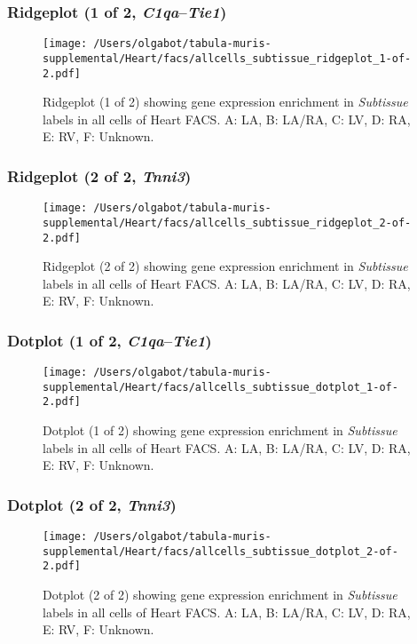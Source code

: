 \clearpage

\subsubsection{Ridgeplot (1 of 2, \emph{C1qa}--\emph{Tie1})}
\begin{figure}[h]
\centering
\texttt{[image: /Users/olgabot/tabula-muris-supplemental/Heart/facs/allcells\_subtissue\_ridgeplot\_1-of-2.pdf]}

\caption{ Ridgeplot (1 of 2)  showing gene expression enrichment in \emph{Subtissue} labels in all cells of Heart FACS. A: LA, B: LA/RA, C: LV, D: RA, E: RV, F: Unknown.}
\end{figure}


\clearpage

\subsubsection{Ridgeplot (2 of 2, \emph{Tnni3})}
\begin{figure}[h]
\centering
\texttt{[image: /Users/olgabot/tabula-muris-supplemental/Heart/facs/allcells\_subtissue\_ridgeplot\_2-of-2.pdf]}

\caption{ Ridgeplot (2 of 2)  showing gene expression enrichment in \emph{Subtissue} labels in all cells of Heart FACS. A: LA, B: LA/RA, C: LV, D: RA, E: RV, F: Unknown.}
\end{figure}


\clearpage

\subsubsection{Dotplot (1 of 2, \emph{C1qa}--\emph{Tie1})}
\begin{figure}[h]
\centering
\texttt{[image: /Users/olgabot/tabula-muris-supplemental/Heart/facs/allcells\_subtissue\_dotplot\_1-of-2.pdf]}

\caption{ Dotplot (1 of 2)  showing gene expression enrichment in \emph{Subtissue} labels in all cells of Heart FACS. A: LA, B: LA/RA, C: LV, D: RA, E: RV, F: Unknown.}
\end{figure}


\clearpage

\subsubsection{Dotplot (2 of 2, \emph{Tnni3})}
\begin{figure}[h]
\centering
\texttt{[image: /Users/olgabot/tabula-muris-supplemental/Heart/facs/allcells\_subtissue\_dotplot\_2-of-2.pdf]}

\caption{ Dotplot (2 of 2)  showing gene expression enrichment in \emph{Subtissue} labels in all cells of Heart FACS. A: LA, B: LA/RA, C: LV, D: RA, E: RV, F: Unknown.}
\end{figure}

